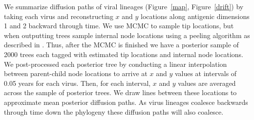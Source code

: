 \documentclass[11pt,oneside,letterpaper]{article}
\newcommand{\normal}{\mathcal{N}}					%
\newcommand{\twomatrix}[2]{\left( \begin{matrix} #1 \\ #2 \end{matrix} \right)}								%
\newcommand{\fourmatrix}[4]{\left( \begin{matrix} #1 & #2 \\ #3 & #4 \end{matrix} \right)}					%
\begin{document}
We summarize diffusion paths of viral lineages (Figure~\ref{map}, Figure~\ref{drift}) by taking each virus and reconstructing $x$ and $y$ locations along antigenic dimensions 1 and 2 backward through time.
We use MCMC to sample tip locations, but when outputting trees sample internal node locations using a peeling algorithm as described in \cite{Pybus12}.
Thus, after the MCMC is finished we have a posterior sample of 2000 trees each tagged with estimated tip locations and internal node locations.
We post-processed each posterior tree by conducting a linear interpolation between parent-child node locations to arrive at $x$ and $y$ values at intervals of 0.05 years for each virus.
Then, for each interval, $x$ and $y$ values are averaged across the sample of posterior trees.
We draw lines between these locations to approximate mean posterior diffusion paths.
As virus lineages coalesce backwards through time down the phylogeny these diffusion paths will also coalesce.


\end{document}

